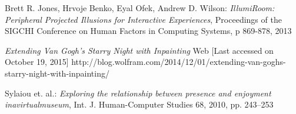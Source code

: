 \documentclass[a4paper]{article}
\begin{document}
\begin{thebibliography}{99}
 Brett R. Jones, Hrvoje Benko, Eyal Ofek, Andrew D. Wilson:
\emph{IllumiRoom: Peripheral Projected Illusions for
Interactive Experiences},
Proceedings of the SIGCHI Conference on Human Factors in Computing Systems, p 869-878, 2013

\emph{Extending Van Gogh’s \emph{Starry Night} with Inpainting}
Web [Last accessed on October 19, 2015]
http://blog.wolfram.com/2014/12/01/extending-van-goghs-starry-night-with-inpainting/

 Sylaiou et. al.:
\emph{Exploring the relationship between presence and enjoyment inavirtualmuseum},
Int. J. Human-Computer Studies 68, 2010, pp. 243--253

\end{thebibliography}
\end{document}
